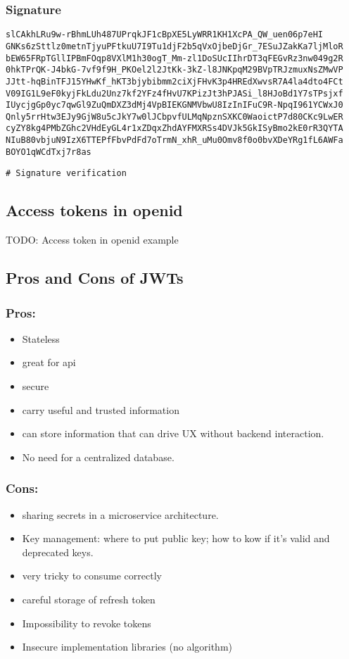 \documentclass[11pt]{style}
\begin{document}
\subsubsection{Signature}
\begin{lstlisting}
slCAkhLRu9w-rBhmLUh487UPrqkJF1cBpXE5LyWRR1KH1XcPA_QW_uen06p7eHI
GNKs6zSttlz0metnTjyuPFtkuU7I9Tu1djF2b5qVxOjbeDjGr_7ESuJZakKa7ljMloR
bEW65FRpTGllIPBmFOqp8VXlM1h30ogT_Mm-zl1DoSUcIIhrDT3qFEGvRz3nw049g2R
0hkTPrQK-J4bkG-7vf9f9H_PKOel2l2JtKk-3kZ-l8JNKpqM29BVpTRJzmuxNsZMwVP
JJtt-hqBinTFJ15YHwKf_hKT3bjybibmm2ciXjFHvK3p4HREdXwvsR7A4la4dto4FCt
V09IG1L9eF0kyjFkLdu2Unz7kf2YFz4fHvU7KPizJt3hPJASi_l8HJoBd1Y7sTPsjxf
IUycjgGp0yc7qwGl9ZuQmDXZ3dMj4VpBIEKGNMVbwU8IzInIFuC9R-NpqI961YCWxJ0
Qnly5rrHtw3EJy9GjW8u5cJkY7w0lJCbpvfULMqNpznSXKC0WaoictP7d80CKc9LwER
cyZY8kg4PMbZGhc2VHdEyGL4r1xZDqxZhdAYFMXRSs4DVJk5GkISyBmo2kE0rR3QYTA
NIuB80vbjuN9IzX6TTEPfFbvPdFd7oTrmN_xhR_uMu0Omv8f0o0bvXDeYRg1fL6AWFa
BOYO1qWCdTxj7r8as
\end{lstlisting}

\begin{lstlisting}
# Signature verification
\end{lstlisting}

\subsection{Access tokens in openid}
TODO: Access token in openid example

\subsection{Pros and Cons of JWTs}
\subsubsection{Pros:}
\begin{itemize}
    \item Stateless
    \item great for api
    \item secure
    \item carry useful and trusted information
    \item can store information that can drive UX without backend interaction.
    \item No need for a centralized database.
\end{itemize}
\subsubsection{Cons:}
\begin{itemize}
    \item sharing secrets in a microservice architecture.
    \item Key management: where to put public key; how to kow if it's valid and
        deprecated keys.
    \item very tricky to consume correctly
    \item careful storage of refresh token
    \item Impossibility to revoke tokens
    \item Insecure implementation libraries (no algorithm)
\end{itemize}
\end{document}
